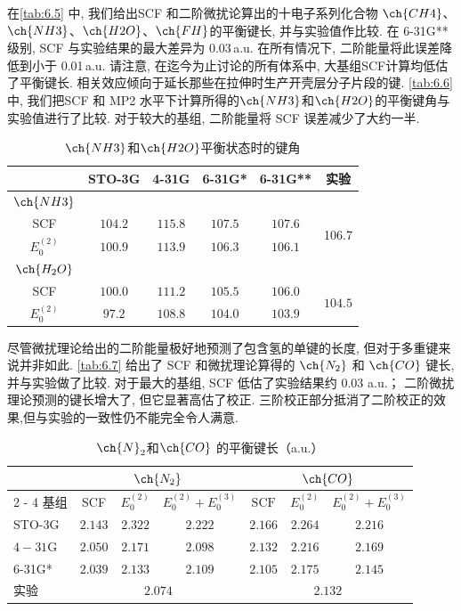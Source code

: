 在\autoref{tab:6.5} 中, 
我们给出SCF 和二阶微扰论算出的十电子系列化合物
$\ch{CH4}$、$\ch{NH3}$、$\ch{H2O}$、$\ch{FH}$的平衡键长, 
并与实验值作比较. 
在 6-31G** 级别, 
SCF 与实验结果的最大差异为 0.03\,a.u. 
在所有情况下, 
二阶能量将此误差降低到小于 0.01\,a.u. 
请注意, 在迄今为止讨论的所有体系中, 
大基组SCF计算均低估了平衡键长. 
相关效应倾向于延长那些在拉伸时生产开壳层分子片段的键.  
\autoref{tab:6.6}中, 
我们把SCF 和 MP2 水平下计算所得的$\ch{NH3}$和$\ch{H2O}$的平衡键角与实验值进行了比较.  
对于较大的基组, 
二阶能量将 SCF 误差减少了大约一半. 
\begin{table}
	\centering
	\caption{$\ch{NH3}$和$\ch{H2O}$平衡状态时的键角}
	\begin{threeparttable}
	\begin{tabular}{cccccc}
		\hline & STO-3G & 4-31G & 6-31G* & 6-31G** & 实验 \\
		\hline $\ch{NH3}$ & & & & & \\
                \multicolumn{1}{c}{\quad SCF} & $104.2$ & $115.8$ & $107.5$ & $107.6$ & \multirow{2}{*}{106.7} \\
                \multicolumn{1}{c}{\quad $E_0^{(2)}$} & $100.9$ & $113.9$ & $106.3$ & $106.1$ & \\
		$\ch{H_2O}$ & & & & & \\
                \multicolumn{1}{c}{\quad SCF} & $100.0$ & $111.2$ & $105.5$ & $106.0$ & \multirow{2}{*}{$104.5$} \\
                \multicolumn{1}{c}{\quad $E_0^{(2)}$} & $97.2$ & $108.8$ & $104.0$ & $103.9$ & \\
		\hline
	\end{tabular}
	\end{threeparttable}
	\label{tab:6.6}
\end{table}

尽管微扰理论给出的二阶能量极好地预测了包含氢的单键的长度, 但对于多重键来说并非如此.  
\autoref{tab:6.7} 给出了 SCF 和微扰理论算得的 $\ch{N_2}$ 和 $\ch{CO}$ 键长, 并与实验做了比较.  
对于最大的基组, SCF 低估了实验结果约 0.03 a.u.； 二阶微扰理论预测的键长增大了, 但它显著高估了校正.  
三阶校正部分抵消了二阶校正的效果,但与实验的一致性仍不能完全令人满意. 
\begin{table}\centering
	\caption{$\ch{N}_2$和$\ch{CO}$ 的平衡键长（a.u.）}
	\begin{tabular}{lcccccc}
		\hline 
		& \multicolumn{3}{c}{$\ch{N_2}$} &  \multicolumn{3}{c}{$\ch{CO}$} \\
		\cline { 2 - 4 } \cline { 5 - 7 } 基组 & SCF & $E_0^{(2)}$ & $E_0^{(2)}+E_0^{(3)}$ &  $\mathrm{SCF}$ & $E_0^{(2)}$ & $E_0^{(2)}+E_0^{(3)}$ \\
		\hline STO-3G & $2.143$ & $2.322$ & $2.222$ &  $2.166$ & $2.264$ & $2.216$ \\
		$4-31 \mathrm{G}$ & $2.050$ & $2.171$ & $2.098$  & $2.132$ & $2.216$ & $2.169$ \\
		6-31G* & $2.039$ & $2.133$ & $2.109$ &  $2.105$ & $2.175$ & $2.145$ \\
		实验 & \multicolumn{3}{c}{$2.074$}& \multicolumn{3}{c}{$2.132$}  \\
		\hline
	\end{tabular}
\label{tab:6.7}
\end{table}

